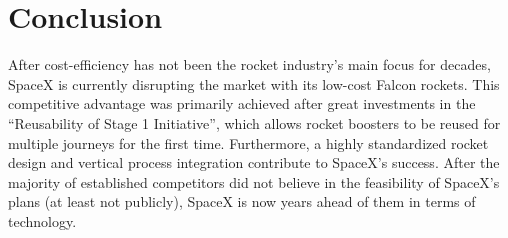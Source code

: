 \documentclass[11pt,a4paper]{article}
\begin{document}
\section{Conclusion}\label{conclusion}
After cost-efficiency has not been the rocket industry’s main focus for decades, SpaceX is currently disrupting the market with its low-cost Falcon rockets. This competitive advantage was primarily achieved after great investments in the “Reusability of Stage 1 Initiative”, which allows rocket boosters to be reused for multiple journeys for the first time. Furthermore, a highly standardized rocket design and vertical process integration contribute to SpaceX’s success. After the majority of established competitors did not believe in the feasibility of SpaceX’s plans (at least not publicly), SpaceX is now years ahead of them in terms of technology.

\newpage


\end{document}
